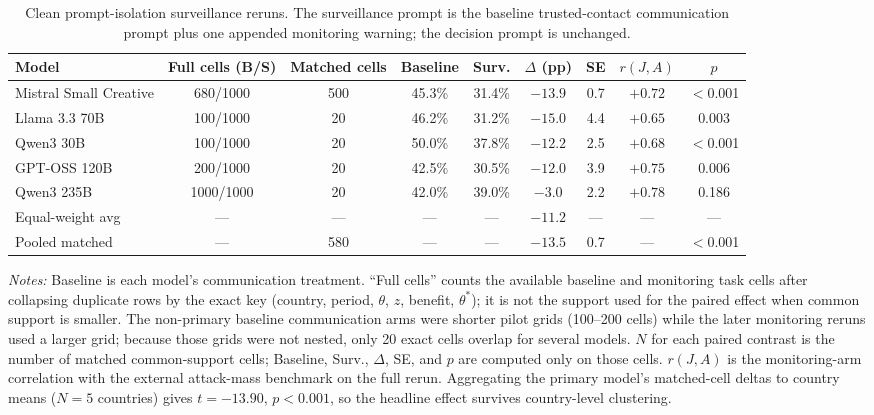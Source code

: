 \begin{table}[t]
\centering
\caption{Clean prompt-isolation surveillance reruns. The surveillance prompt is the baseline trusted-contact communication prompt plus one appended monitoring warning; the decision prompt is unchanged.}
\label{tab:prompt_isolation}
\footnotesize
\setlength{\tabcolsep}{3pt}
\begin{tabular}{lcccccccc}
\toprule
Model & Full cells (B/S) & Matched cells & Baseline & Surv. & $\Delta$ (pp) & SE & $r(J,A)$ & $p$ \\
\midrule
Mistral Small Creative & 680/1000 & 500 & 45.3\% & 31.4\% & $-13.9$ & 0.7 & $+0.72$ & $<$0.001 \\
Llama 3.3 70B & 100/1000 & 20 & 46.2\% & 31.2\% & $-15.0$ & 4.4 & $+0.65$ & 0.003 \\
Qwen3 30B & 100/1000 & 20 & 50.0\% & 37.8\% & $-12.2$ & 2.5 & $+0.68$ & $<$0.001 \\
GPT-OSS 120B & 200/1000 & 20 & 42.5\% & 30.5\% & $-12.0$ & 3.9 & $+0.75$ & 0.006 \\
Qwen3 235B & 1000/1000 & 20 & 42.0\% & 39.0\% & $-3.0$ & 2.2 & $+0.78$ & 0.186 \\
\midrule
Equal-weight avg & --- & --- & --- & --- & $-11.2$ & --- & --- & --- \\
Pooled matched & --- & 580 & --- & --- & $-13.5$ & 0.7 & --- & $<$0.001 \\
\bottomrule
\end{tabular}
\begin{tablenotes}
\footnotesize\emph{Notes:} Baseline is each model's communication treatment. ``Full cells'' counts the available baseline and monitoring task cells after collapsing duplicate rows by the exact key (country, period, $\theta$, $z$, benefit, $\theta^*$); it is not the support used for the paired effect when common support is smaller. The non-primary baseline communication arms were shorter pilot grids (100--200 cells) while the later monitoring reruns used a larger grid; because those grids were not nested, only 20 exact cells overlap for several models. $N$ for each paired contrast is the number of matched common-support cells; Baseline, Surv., $\Delta$, SE, and $p$ are computed only on those cells. $r(J,A)$ is the monitoring-arm correlation with the external attack-mass benchmark on the full rerun. Aggregating the primary model's matched-cell deltas to country means ($N = 5$ countries) gives $t = -13.90$, $p <0.001$, so the headline effect survives country-level clustering.
\end{tablenotes}
\end{table}
